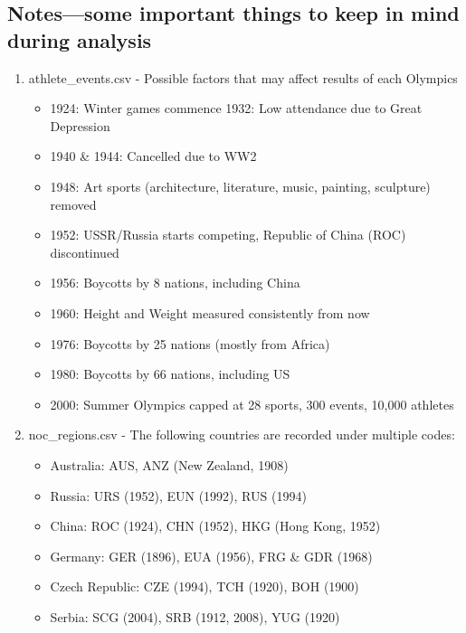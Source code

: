 \documentclass[a4 paper, 12pt]{memoir}
\begin{document}
\subsection*{Notes—some important things to keep in mind during analysis}
    \begin{enumerate}
        \item athlete\_events.csv - Possible factors that may affect results of each Olympics
            \begin{itemize}
                \item 1924: Winter games commence
                1932: Low attendance due to Great Depression
                \item 1940 \& 1944: Cancelled due to WW2
                \item 1948: Art sports (architecture, literature, music, painting, sculpture) removed
                \item 1952: USSR/Russia starts competing, Republic of China (ROC) discontinued
                \item 1956: Boycotts by 8 nations, including China
                \item 1960: Height and Weight measured consistently from now
                \item 1976: Boycotts by 25 nations (mostly from Africa)
                \item 1980: Boycotts by 66 nations, including US
                \item 2000: Summer Olympics capped at 28 sports, 300 events, 10,000 athletes                
            \end{itemize}

        \item noc\_regions.csv - The following countries are recorded under multiple codes:
            
        \begin{itemize}
                \item Australia: AUS, ANZ (New Zealand, 1908)
                \item Russia: URS (1952), EUN (1992), RUS (1994)
                \item China: ROC (1924), CHN (1952), HKG (Hong Kong, 1952)
                \item Germany: GER (1896), EUA (1956), FRG \& GDR (1968)
                \item Czech Republic: CZE (1994), TCH (1920), BOH (1900)
                \item Serbia: SCG (2004), SRB (1912, 2008), YUG (1920)                    
            \end{itemize}  

    \end{enumerate}
\end{document}
